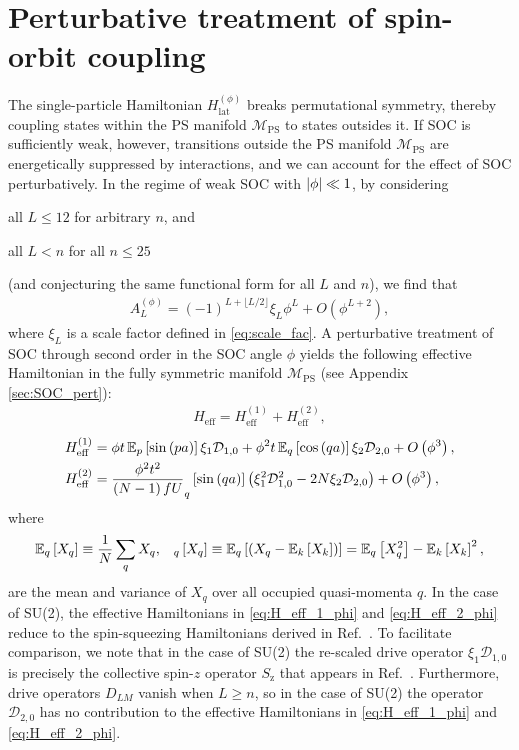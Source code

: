 \documentclass[nofootinbib,notitlepage,11pt]{revtex4-2}
\renewcommand{\t}{\text} %
\newcommand{\f}[2]{\dfrac{#1}{#2}} %
\newcommand{\p}[1]{\left(#1\right)} %
\renewcommand{\sp}[1]{\left[#1\right]} %
\newcommand{\1}{\mathds{1}}
\newcommand{\z}{\text{z}}
\newcommand{\D}{\mathcal{D}}
\newcommand{\M}{\mathcal{M}}
\newcommand{\EE}{\mathbb{E}}
\newcommand{\PS}{\text{PS}}
\let\var\relax
\DeclareMathOperator{\var}{var}
\begin{document}
\section{Perturbative treatment of spin-orbit coupling}
\label{sec:pert_SOC}

The single-particle Hamiltonian $H_{\t{lat}}^{(\phi)}$ breaks
permutational symmetry, thereby coupling states within the PS manifold
$\M_\PS$ to states outsides it.  If SOC is sufficiently weak, however,
transitions outside the PS manifold $\M_\PS$ are energetically
suppressed by interactions, and we can account for the effect of SOC
perturbatively.  In the regime of weak SOC with $\abs{\phi}\ll1$, by
considering
\begin{enumerate*}
\item all $L\le12$ for arbitrary $n$, and
\item all $L<n$ for all $n\le25$
\end{enumerate*}
(and conjecturing the same functional form for all $L$ and $n$), we
find that
\begin{align}
  A_L^{(\phi)}
  = \p{-1}^{L+\lfloor L/2\rfloor} \xi_L \phi^L + O\p{\phi^{L+2}},
  \label{eq:A_L_phi_small}
\end{align}
where $\xi_L$ is a scale factor defined in \eqref{eq:scale_fac}.  A
perturbative treatment of SOC through second order in the SOC angle
$\phi$ yields the following effective Hamiltonian in the fully
symmetric manifold $\M_\PS$ (see Appendix \ref{sec:SOC_pert}):
\begin{align}
  H_{\t{eff}} = H_{\t{eff}}^{(1)} + H_{\t{eff}}^{(2)},
\end{align}
\begin{align}
  H_{\t{eff}}^{(1)}
  &= \phi t \, \EE_p\sp{\sin\p{pa}} \xi_1 \D_{1,0}
  + \phi^2 t \, \EE_q\sp{\cos\p{qa}} \xi_2 \D_{2,0}
  + O\p{\phi^3},
  \label{eq:H_eff_1_phi} \\
  H_{\t{eff}}^{(2)}
  &= \f{\phi^2 t^2}{\p{N-1}fU} \var_q\sp{\sin\p{qa}}
  \p{\xi_1^2 \D_{1,0}^2 - 2 N \xi_2 \D_{2,0}}
  + O\p{\phi^3},
  \label{eq:H_eff_2_phi}
\end{align}
where
\begin{align}
  \EE_q\sp{X_q} \equiv \f1N \sum_q X_q,
  &&
  \var_q\sp{X_q} \equiv \EE_q\sp{\p{X_q-\EE_k\sp{X_k}}}
  = \EE_q\sp{X_q^2}-\EE_k\sp{X_k}^2,
\end{align}
are the mean and variance of $X_q$ over all occupied quasi-momenta
$q$.  In the case of SU(2), the effective Hamiltonians in
\eqref{eq:H_eff_1_phi} and \eqref{eq:H_eff_2_phi} reduce to the
spin-squeezing Hamiltonians derived in Ref.~\cite{he2019engineering}.
To facilitate comparison, we note that in the case of SU(2) the
re-scaled drive operator $\xi_1\D_{1,0}$ is precisely the collective
spin-$z$ operator $S_\z$ that appears in
Ref.~\cite{he2019engineering}.  Furthermore, drive operators $D_{LM}$
vanish when $L\ge n$, so in the case of SU(2) the operator $\D_{2,0}$
has no contribution to the effective Hamiltonians in
\eqref{eq:H_eff_1_phi} and \eqref{eq:H_eff_2_phi}.
\end{document}
